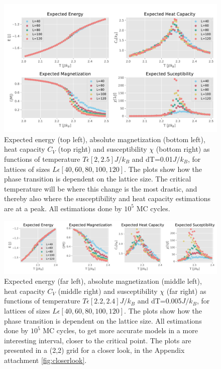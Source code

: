 \documentclass[10pt, nofootinbib, twocolumn]{revtex4-1}
\begin{document}
\begin{figure}
    \centering
    \includegraphics[width = 1\textwidth]{figures/sizevariations.pdf} 
    \caption{Expected energy (top left), absolute magnetization (bottom left), heat capacity $C_V$ (top right) and susceptibility $\chi$ (bottom right) as functions of temperature $T\epsilon [2,2.5]J/k_B$ and dT=0.01$J/k_B$, for lattices of sizes $L\epsilon [40, 60, 80, 100, 120]$. The plots show how the phase transition is dependent on the lattice size. The critical temperature will be where this change is the most drastic, and thereby also where the susceptibility and heat capacity estimations are at a peak. All estimations done by $10^5$ MC cycles.}
    \label{fig:sizevar}
\end{figure} 
\begin{figure}
    \centering
    \includegraphics[width = 1\textwidth]{figures/sizevariationszoom.pdf} 
    \caption{Expected energy (far left), absolute magnetization (middle left), heat capacity $C_V$ (middle right) and susceptibility $\chi$ (far right) as functions of temperature $T\epsilon [2.2,2.4]J/k_B$ and dT=0.005$J/k_B$, for lattices of sizes $L\epsilon [40, 60, 80, 100, 120]$. The plots show how the phase transition is dependent on the lattice size. All estimations done by $10^5$ MC cycles, to get more accurate models in a more interesting interval, closer to the critical point. The plots are presented in a (2,2) grid for a closer look, in the Appendix attachment \ref{fig:closerlook}.}
    \label{fig:sizevarzoom}
\end{figure} 
\end{document}
